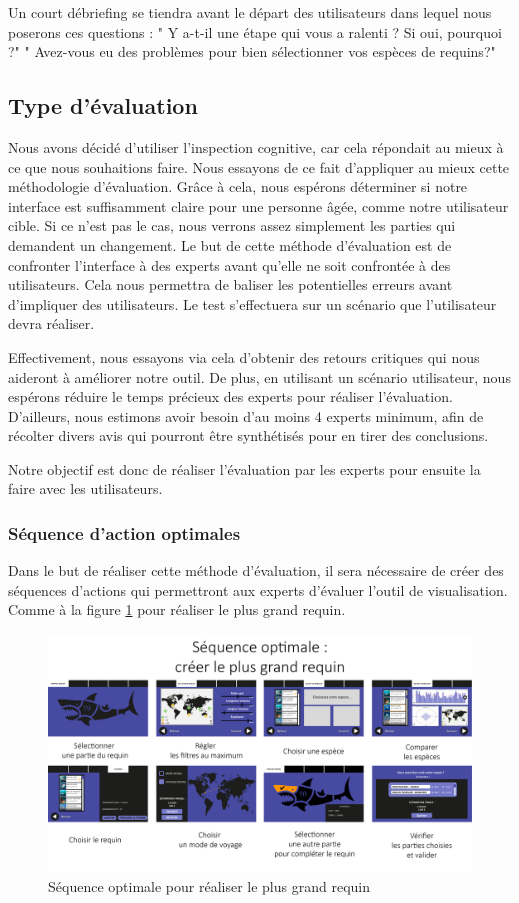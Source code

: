 \documentclass{article}
\begin{document}
Un court débriefing se tiendra avant le départ des utilisateurs dans lequel nous poserons ces questions :
" Y a-t-il une étape qui vous a ralenti ? Si oui, pourquoi ?"
" Avez-vous eu des problèmes pour bien sélectionner vos espèces de requins?"
\subsection{Type d'évaluation}
Nous avons décidé d'utiliser l'inspection cognitive, car cela répondait au mieux à ce que nous souhaitions faire. Nous essayons de ce fait d'appliquer au mieux cette méthodologie d'évaluation. Grâce à cela, nous espérons déterminer si notre interface est suffisamment claire pour une personne âgée, comme notre utilisateur cible. Si ce n'est pas le cas, nous verrons assez simplement les parties qui demandent un changement.
Le but de cette méthode d'évaluation est de confronter l'interface à des experts avant qu'elle ne soit confrontée à des utilisateurs. Cela nous permettra de baliser les potentielles erreurs avant d'impliquer des utilisateurs.
Le test s'effectuera sur un scénario que l'utilisateur devra réaliser.

Effectivement, nous essayons via cela d'obtenir des retours critiques qui nous aideront à améliorer notre outil.
De plus, en utilisant un scénario utilisateur, nous espérons réduire le temps précieux des experts pour réaliser l'évaluation.
D'ailleurs, nous estimons avoir besoin d'au moins 4 experts minimum, afin de récolter divers avis qui pourront être synthétisés pour en tirer des conclusions.

Notre objectif est donc de réaliser l'évaluation par les experts pour ensuite la faire avec les utilisateurs.

\subsubsection{Séquence d'action optimales}
Dans le but de réaliser cette méthode d'évaluation, il sera nécessaire de créer des séquences d'actions qui permettront aux experts d'évaluer l'outil de visualisation. Comme à la figure \ref{sequence_optimale} pour réaliser le plus grand requin.
\begin{figure}[!h]
	\centering
	\includegraphics[width=14.4cm]{assets/sequence_optimale}
	\caption{Séquence optimale pour réaliser le plus grand requin}
	\label{sequence_optimale}
\end{figure}
\FloatBarrier
\end{document}
